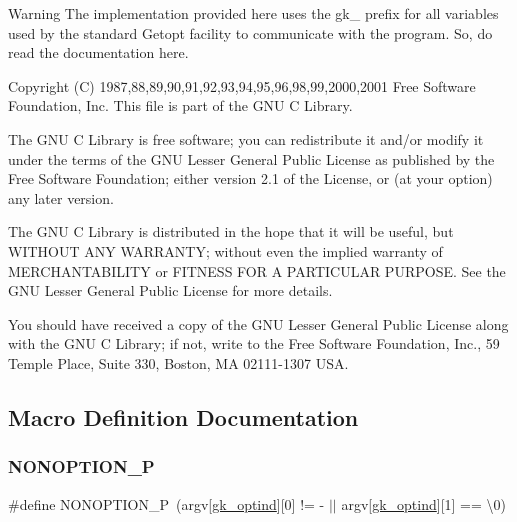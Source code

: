 \begin{DoxyWarning}{Warning}
The implementation provided here uses the {\ttfamily gk\+\_\+} prefix for all variables used by the standard Getopt facility to communicate with the program. So, do read the documentation here.
\end{DoxyWarning}
\begin{DoxyVerb}   Copyright (C) 1987,88,89,90,91,92,93,94,95,96,98,99,2000,2001
   Free Software Foundation, Inc. This file is part of the GNU C Library.

   The GNU C Library is free software; you can redistribute it and/or
   modify it under the terms of the GNU Lesser General Public
   License as published by the Free Software Foundation; either
   version 2.1 of the License, or (at your option) any later version.

   The GNU C Library is distributed in the hope that it will be useful,
   but WITHOUT ANY WARRANTY; without even the implied warranty of
   MERCHANTABILITY or FITNESS FOR A PARTICULAR PURPOSE.  See the GNU
   Lesser General Public License for more details.

   You should have received a copy of the GNU Lesser General Public
   License along with the GNU C Library; if not, write to the Free
   Software Foundation, Inc., 59 Temple Place, Suite 330, Boston, MA
   02111-1307 USA.  
\end{DoxyVerb}
 

\subsection{Macro Definition Documentation}
\mbox{\label{a00038_a71ceb8911d64b39b402041ba5ea8453c}} 
\subsubsection{\texorpdfstring{N\+O\+N\+O\+P\+T\+I\+O\+N\+\_\+P}{NONOPTION\_P}}
{\footnotesize\ttfamily \#define N\+O\+N\+O\+P\+T\+I\+O\+N\+\_\+P~(argv\mbox{[}\hyperlink{a00050_ab70fc0e7e22192b687bd0d377bf61e32}{gk\+\_\+optind}\mbox{]}\mbox{[}0\mbox{]} != \textquotesingle{}-\/\textquotesingle{} $\vert$$\vert$ argv\mbox{[}\hyperlink{a00050_ab70fc0e7e22192b687bd0d377bf61e32}{gk\+\_\+optind}\mbox{]}\mbox{[}1\mbox{]} == \textquotesingle{}\textbackslash{}0\textquotesingle{})}



